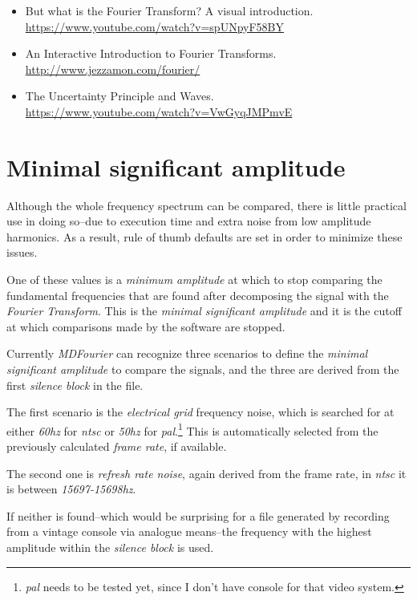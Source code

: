 \documentclass[10pt,a4paper]{report}
\newcommand{\ac}[1]{\textit{\mbox{\acrshort{#1}}}}
\newcommand{\hz}[1]{\textit{\mbox{#1\acrshort{hz}}}}
\begin{document}
\begin{itemize}
	\item But what is the Fourier Transform? A visual introduction.\\ \url{https://www.youtube.com/watch?v=spUNpyF58BY}
	\item An Interactive Introduction to Fourier Transforms.\\ \url{http://www.jezzamon.com/fourier/}
	\item The Uncertainty Principle and Waves.\\ \url{https://www.youtube.com/watch?v=VwGyqJMPmvE}
\end{itemize}

\section{Minimal significant amplitude}
\label{MinSigAmplitude}

Although the whole frequency spectrum can be compared, there is little practical use in doing so--due to execution time and extra noise from low amplitude harmonics. As a result, rule of thumb defaults are set in order to minimize these issues.

One of these values is a \textit{minimum amplitude} at which to stop comparing the fundamental frequencies that are found after decomposing the signal with the \textit{Fourier Transform}. This is the \textit{minimal significant amplitude} and it is the cutoff at which comparisons made by the software are stopped.

Currently \textit{MDFourier} can recognize three scenarios to define the \textit{minimal significant amplitude} to compare the signals, and the three are derived from the first \textit{silence block} in the file.

The first scenario is the \textit{electrical grid} frequency noise, which is searched for at either \hz{60} for \ac{ntsc} or \hz{50} for \ac{pal}.\footnote{\ac{pal} needs to be tested yet, since I don't have console for that video system.} This is automatically selected from the previously calculated \textit{frame rate}, if available.

The second one is \textit{refresh rate noise}, again derived from the frame rate, in \ac{ntsc} it is between \hz{15697-15698}. 

If neither is found--which would be surprising for a file generated by recording from a vintage console via analogue means--the frequency with the highest amplitude within the \textit{silence block} is used. 
\end{document}
